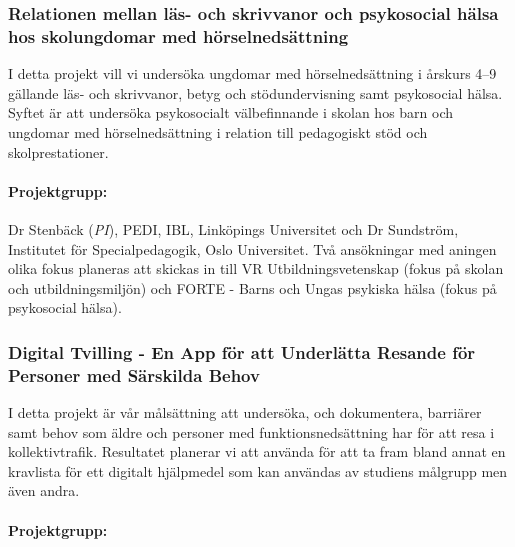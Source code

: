 \documentclass[]{article}
\begin{document}
\hypertarget{relationen-mellan-luxe4s--och-skrivvanor-och-psykosocial-huxe4lsa-hos-skolungdomar-med-huxf6rselnedsuxe4ttning}{%
\subsubsection{Relationen mellan läs- och skrivvanor och psykosocial
hälsa hos skolungdomar med
hörselnedsättning}\label{relationen-mellan-luxe4s--och-skrivvanor-och-psykosocial-huxe4lsa-hos-skolungdomar-med-huxf6rselnedsuxe4ttning}}

I detta projekt vill vi undersöka ungdomar med hörselnedsättning i
årskurs 4--9 gällande läs- och skrivvanor, betyg och stödundervisning
samt psykosocial hälsa. Syftet är att undersöka psykosocialt
välbefinnande i skolan hos barn och ungdomar med hörselnedsättning i
relation till pedagogiskt stöd och skolprestationer.

\hypertarget{projektgrupp-1}{%
\paragraph{Projektgrupp:}\label{projektgrupp-1}}

Dr Stenbäck (\emph{PI}), PEDI, IBL, Linköpings Universitet och Dr
Sundström, Institutet för Specialpedagogik, Oslo Universitet. Två
ansökningar med aningen olika fokus planeras att skickas in till VR
Utbildningsvetenskap (fokus på skolan och utbildningsmiljön) och FORTE -
Barns och Ungas psykiska hälsa (fokus på psykosocial hälsa).

\hypertarget{digital-tvilling---en-app-fuxf6r-att-underluxe4tta-resande-fuxf6r-personer-med-suxe4rskilda-behov}{%
\subsubsection{Digital Tvilling - En App för att Underlätta Resande för
Personer med Särskilda
Behov}\label{digital-tvilling---en-app-fuxf6r-att-underluxe4tta-resande-fuxf6r-personer-med-suxe4rskilda-behov}}

I detta projekt är vår målsättning att undersöka, och dokumentera,
barriärer samt behov som äldre och personer med funktionsnedsättning har
för att resa i kollektivtrafik. Resultatet planerar vi att använda för
att ta fram bland annat en kravlista för ett digitalt hjälpmedel som kan
användas av studiens målgrupp men även andra.

\hypertarget{projektgrupp-2}{%
\paragraph{Projektgrupp:}\label{projektgrupp-2}}
\end{document}
